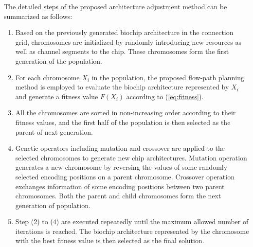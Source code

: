 The detailed steps of the proposed architecture adjustment method can be summarized as follows:
\begin{enumerate}
  \item
  Based on the previously generated biochip architecture in the connection grid, chromosomes are initialized by randomly introducing new resources as well as channel segments to the chip. These chromosomes form the first generation of the population.

  \item \label{item:iteration_begin}
  For each chromosome $X_i$ in the population, the proposed flow-path planning method is employed to evaluate the biochip architecture represented by $X_i$ and generate a fitness value $F(X_i)$ according to (\ref{eq:fitness}).

  \item
  All the chromosomes are sorted in non-increasing order according to their fitness values, and the first half of the population is then selected as the parent of next generation.

  \item \label{item:new_gen}
  Genetic operators including mutation and crossover are applied to the selected chromosomes to generate new chip architectures. Mutation operation generates a new chromosome by reversing the values of some randomly selected encoding positions on a parent chromosome. Crossover operation exchanges information of some encoding positions between two parent chromosomes. Both the parent and child chromosomes form the next generation of population.

  \item
  Step (2) to (4) are executed repeatedly  until the maximum allowed number of iterations is reached. The biochip architecture represented by the chromosome with the best fitness value is then selected as the final solution.
\end{enumerate}






